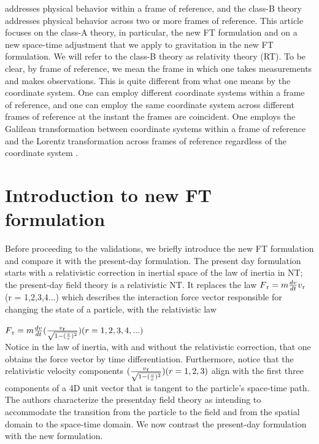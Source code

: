 \documentclass[12pt]{article}
\begin{document}
addresses physical behavior within a frame of reference, and
the class-B theory addresses physical behavior across two or
more frames of reference. This article focuses on the class-A
theory, in particular, the new FT formulation and on a new
space-time adjustment that we apply to gravitation in the 
new FT formulation. We will refer to the class-B theory as
relativity theory (RT). To be clear, by frame of reference, we
mean the frame in which one takes measurements and makes
observations. This is quite different from what one means by
the coordinate system. One can employ different coordinate
systems within a frame of reference, and one can employ the
same coordinate system across different frames of reference
at the instant the frames are coincident. One employs the
Galilean transformation between coordinate systems within a
frame of reference and the Lorentz transformation across
frames of reference regardless of the coordinate system .

\section{Introduction to new FT formulation}
Before proceeding to the validations, we briefly introduce the new FT formulation and compare it with the
present-day formulation. The present day formulation starts
with a relativistic correction in inertial space of the law of
inertia in NT; the present-day field theory is a relativistic
NT. It replaces the law 
$F \textsubscript{r} = m\frac{dv}{dt} v \textsubscript{r} $ (r = 1,2,3,4...)
 which
describes the interaction force vector responsible for changing the state of a particle, with the relativistic law

$F \textsubscript{r} = m\frac{dv}{dt} (\frac{v \textsubscript{r}}{\sqrt{1-(\frac{v}{c})^2} } ) (r=1,2,3,4,...)$ \\
Notice in the law
of inertia, with and without the relativistic correction,
that one obtains the force vector by time differentiation.
Furthermore, notice that the relativistic velocity components
$(\frac{v \textsubscript{r}}{\sqrt{1-(\frac{v}{c})^2} } ) (r=1,2,3)$
align with the first three
components of a 4D unit vector that is tangent to the particle’s space-time path. The authors characterize the presentday field theory as intending to accommodate the transition
from the particle to the field and from the spatial domain to
the space-time domain. We now contrast the present-day formulation with the new formulation.
\end{document}
